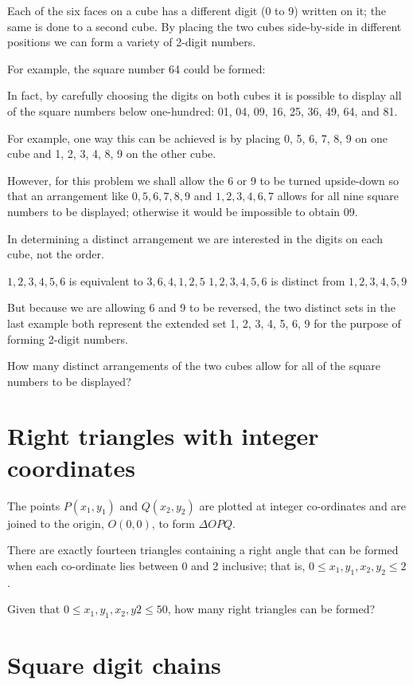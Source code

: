 Each of the six faces on a cube has a different digit (0 to 9) written on it; the same is done to a second cube. By placing the two cubes side-by-side in different positions we can form a variety of 2-digit numbers.

For example, the square number 64 could be formed:

In fact, by carefully choosing the digits on both cubes it is possible to display all of the square numbers below one-hundred: 01, 04, 09, 16, 25, 36, 49, 64, and 81.

For example, one way this can be achieved is by placing {0, 5, 6, 7, 8, 9} on one cube and {1, 2, 3, 4, 8, 9} on the other cube.

However, for this problem we shall allow the 6 or 9 to be turned upside-down so that an arrangement like ${0, 5, 6, 7, 8, 9}$ and ${1, 2, 3, 4, 6, 7}$ allows for all nine square numbers to be displayed; otherwise it would be impossible to obtain 09.

In determining a distinct arrangement we are interested in the digits on each cube, not the order.

${1, 2, 3, 4, 5, 6}$ is equivalent to ${3, 6, 4, 1, 2, 5}$
${1, 2, 3, 4, 5, 6}$ is distinct from ${1, 2, 3, 4, 5, 9}$

But because we are allowing 6 and 9 to be reversed, the two distinct sets in the last example both represent the extended set {1, 2, 3, 4, 5, 6, 9} for the purpose of forming 2-digit numbers.

How many distinct arrangements of the two cubes allow for all of the square numbers to be displayed?

\section{Right triangles with integer coordinates} \label{pb.091}

The points $P(x_1, y_1)$ and $Q(x_2, y_2)$ are plotted at integer co-ordinates and are joined to the origin, $O(0,0)$, to form $\Delta OPQ$.

There are exactly fourteen triangles containing a right angle that can be formed when each co-ordinate lies between 0 and 2 inclusive; that is,
$0  \leqslant  x_1, y_1, x_2, y_2  \leqslant  2$.

Given that $0  \leqslant  x_1, y_1, x_2, y2  \leqslant  50$, how many right triangles can be formed?

\section{Square digit chains} \label{pb.092}

